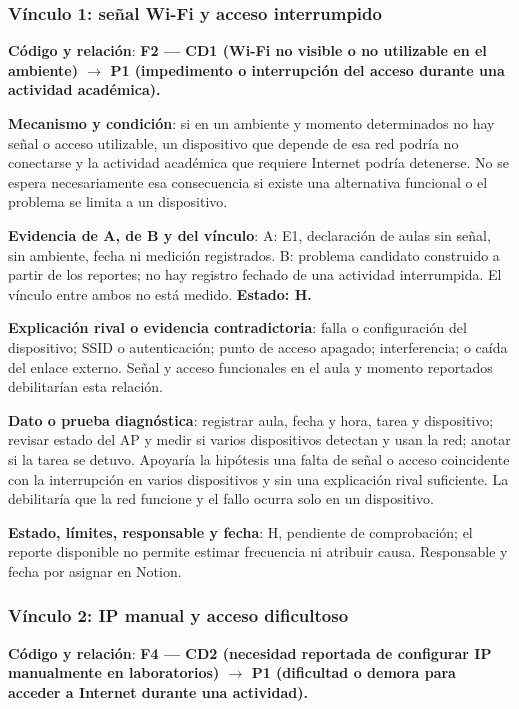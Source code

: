 \subsubsection{Vínculo 1: señal Wi-Fi y acceso interrumpido}

	\textbf{Código y relación}: \textbf{F2 --- CD1 (Wi-Fi no visible o no utilizable en el ambiente) $\rightarrow$ P1 (impedimento o interrupción del acceso durante una actividad académica).}

	\textbf{Mecanismo y condición}: si en un ambiente y momento determinados no hay señal o acceso utilizable, un dispositivo que depende de esa red podría no conectarse y la actividad académica que requiere Internet podría detenerse. No se espera necesariamente esa consecuencia si existe una alternativa funcional o el problema se limita a un dispositivo.

	\textbf{Evidencia de A, de B y del vínculo}: A: E1, declaración de aulas sin señal, sin ambiente, fecha ni medición registrados. B: problema candidato construido a partir de los reportes; no hay registro fechado de una actividad interrumpida. El vínculo entre ambos no está medido. \textbf{Estado: H.}

	\textbf{Explicación rival o evidencia contradictoria}: falla o configuración del dispositivo; SSID o autenticación; punto de acceso apagado; interferencia; o caída del enlace externo. Señal y acceso funcionales en el aula y momento reportados debilitarían esta relación.

	\textbf{Dato o prueba diagnóstica}: registrar aula, fecha y hora, tarea y dispositivo; revisar estado del AP y medir si varios dispositivos detectan y usan la red; anotar si la tarea se detuvo. Apoyaría la hipótesis una falta de señal o acceso coincidente con la interrupción en varios dispositivos y sin una explicación rival suficiente. La debilitaría que la red funcione y el fallo ocurra solo en un dispositivo.

	\textbf{Estado, límites, responsable y fecha}: H, pendiente de comprobación; el reporte disponible no permite estimar frecuencia ni atribuir causa. Responsable y fecha por asignar en Notion.

\subsubsection{Vínculo 2: IP manual y acceso dificultoso}

	\textbf{Código y relación}: \textbf{F4 --- CD2 (necesidad reportada de configurar IP manualmente en laboratorios) $\rightarrow$ P1 (dificultad o demora para acceder a Internet durante una actividad).}

